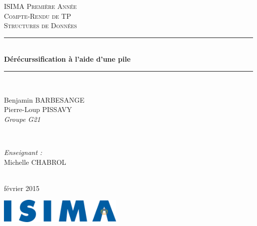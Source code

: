 \begin{titlepage}
  \newcommand{\HRule}{\rule{\linewidth}{0.5mm}}
  \center
  \null{}
  \vspace{3cm}

  \textsc{\LARGE ISIMA Première Année}\\[1.5cm]
  \textsc{\Large Compte-Rendu de TP}\\[0.5cm]
  \textsc{\LARGE Structures de Données}\\[1.5cm]
  \HRule \\[0.4cm]
  { \huge \bfseries Dérécurssification à l'aide d'une pile}\\
  \HRule \\[1.5cm]

  \begin{minipage}{0.4\textwidth}
    \begin{flushleft} \large
      Benjamin BARBESANGE\\
      Pierre-Loup PISSAVY\\
      {\normalsize\textit{Groupe G21}}
    \end{flushleft}
  \end{minipage}
  ~
  \begin{minipage}{0.4\textwidth}
    \begin{flushright} \large
      \emph{Enseignant :} \\
      Michelle CHABROL
    \end{flushright}
  \end{minipage}\\[4cm]

  {\large février 2015}\\[3cm]

  \vfill

  \includegraphics[width=6cm]{settings/ISIMA_logo.pdf}\\[1cm]
\end{titlepage}
